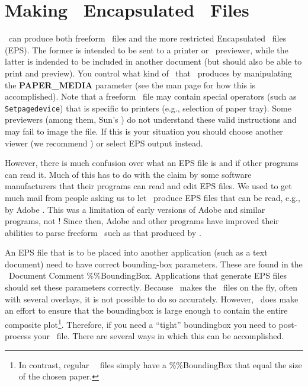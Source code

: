 %
%

\chapter{Making \gmt\ Encapsulated \PS\ Files}
\thispagestyle{headings}

\GMT\ can produce both freeform \PS\ files and the more
restricted Encapsulated \PS\ files (EPS).  The former is
intended to be sent to a printer or \PS\ previewer, while
the latter is indended to be included in another document
(but should also be able to print and preview).  You
control what kind of \PS\ that \GMT\ produces by manipulating
the {\bf PAPER\_MEDIA} parameter (see the  man
page for how this is accomplished).  Note that a freeform \PS\
file may contain special operators (such as \texttt{Setpagedevice})
that is specific to printers (e.g., selection of paper tray).
Some previewers (among them, Sun's ) do not
understand these valid instructions and may fail to image the file.
If this is your situation you should choose another viewer (we
recommend ) or select EPS output instead.

However, there is much confusion over what an EPS file is
and if other programs can read it.  Much of this has to do
with the claim by some software manufacturers that their
programs can read and edit EPS files.  We used to get much
mail from people asking us to let \GMT\ produce EPS files
that can be read, e.g., by Adobe .
This was a limitation of early versions of Adobe  and
similar programs, not \GMT!  Since then, Adobe
\progname{Illustrator} and other programs have
improved their abilities to parse freeform \PS\ such as that produced
by \GMT.

An EPS file that is to be placed into another application
(such as a text document) need to have correct bounding-box
parameters.  These are found in the \PS\ Document
Comment \%\%BoundingBox.  Applications that generate EPS
files should set these parameters correctly.  Because \GMT\
makes the \PS\ files on the fly, often with several
overlays, it is not possible to do so accurately.  However,
\GMT\ does make an effort to ensure that the boundingbox is
large enough to contain the entire composite plot\footnote{In contrast,
regular \GMT\ \PS\ files simply have
a \%\%BoundingBox that equal the size of the chosen paper.}.
Therefore, if you need a ``tight'' boundingbox you need to post-process
your \PS\ file.  There are several ways in which this
can be accomplished.

